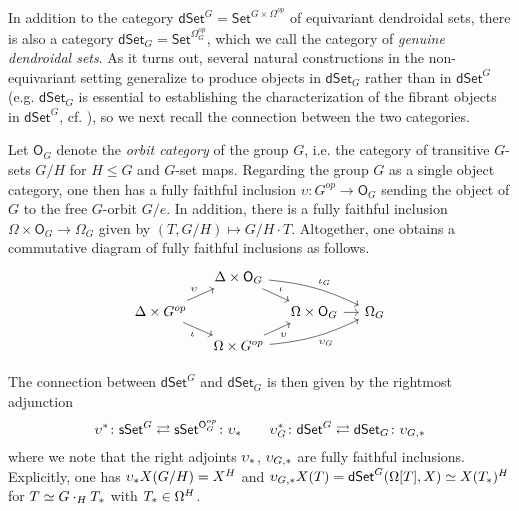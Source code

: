 \documentclass[a4paper,10pt
,draft
]{article}%
\numberwithin{equation}{section}
\numberwithin{figure}{section}
\theoremstyle{definition} %
\newcommand{\dSet}{\mathsf{dSet}}
\newcommand{\1}{\ensuremath{\mathbbm 1}}%
\begin{document}
In addition to the category
$\mathsf{dSet}^G = \mathsf{Set}^{G \times \Omega^{op}}$
of equivariant dendroidal sets,
there is also a category
$\mathsf{dSet}_G = \mathsf{Set}^{\Omega_G^{op}}$,
which we call the category of 
\emph{genuine dendroidal sets}.
As it turns out,
several natural constructions in the non-equivariant setting 
generalize to produce objects in 
$\mathsf{dSet}_G$
rather than in 
$\mathsf{dSet}^G$
(e.g. $\mathsf{dSet}_G$ is essential to establishing the characterization
of the fibrant objects in $\mathsf{dSet}^G$,
cf. \cite[\S 8.2]{Per18}),
so we next recall the connection between the two categories.


Let $\mathsf{O}_G$
denote the \emph{orbit category} of the group $G$,
i.e. the category of transitive $G$-sets $G/H$ for $H\leq G$ and $G$-set maps.
Regarding the group $G$ as a single object category,
one then has a fully faithful inclusion
$\upsilon \colon G^{op} \to \mathsf{O}_G$
sending the object of $G$ to the free $G$-orbit $G/e$. 
In addition, there is a fully faithful inclusion
$\Omega \times \mathsf{O}_G \to \Omega_G$
given by
$(T,G/H) \mapsto G/H \cdot T$.
Altogether, one obtains a commutative diagram of fully faithful inclusions as follows.
\begin{equation}\label{UPSIOTADIAG EQ}
\begin{tikzcd}[row sep=9,column sep=11]
	&
	\Delta \times \mathsf{O}_G 
	\ar{rd}{\iota}
	\ar[bend left=10]{rrd}{\iota_G}
	&
\\
	\Delta \times G^{op} 
	\ar{ru}{\upsilon}
	\ar{rd}[swap]{\iota}
	&&
	\Omega \times \mathsf{O}_G
	\ar{r}
	&
	\Omega_G
\\
	&
	\Omega \times G^{op}
	\ar{ru}[swap]{\upsilon}
	\ar[bend right=10]{rru}[swap]{\upsilon_G}
	&
\end{tikzcd}
\end{equation}



The connection between 
$\mathsf{dSet}^G$ and $\mathsf{dSet}_G$
is then given by the rightmost adjunction
\begin{equation}\label{UPSILONADJ EQ}
	\upsilon^{\**} \colon 
	\mathsf{sSet}^G
	\rightleftarrows
	\mathsf{sSet}^{\mathsf{O}_G^{op}}
	\colon
	\upsilon_{\**}
\qquad
	\upsilon_G^{\**} \colon 
	\mathsf{dSet}^G
	\rightleftarrows
	\mathsf{dSet}_G
	\colon
	\upsilon_{G,\**}
\end{equation}
where we note that the right adjoints 
$\upsilon_{\**}$, $\upsilon_{G,\**}$
are fully faithful inclusions.
Explicitly, one has 
$\upsilon_{\**} X(G/H) = X^H$ and
$\upsilon_{G,\**} X(T) = \dSet^G(\Omega[T], X) \simeq X(T_{\**})^H$
for $T \simeq G \cdot_H T_{\**}$ with $T_{\**} \in \Omega^H$.
\end{document}

